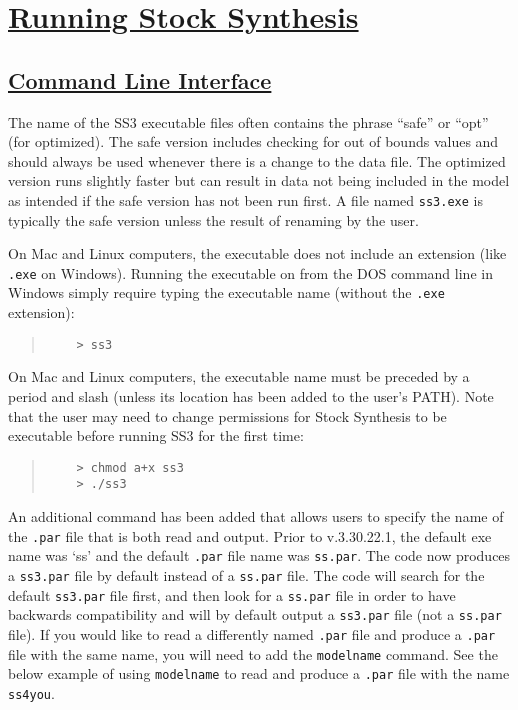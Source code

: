 \section[Running Stock Synthesis]{\protect\hyperref[sec:RunningSS3]{Running Stock Synthesis}} \label{sec:RunningSS3}

\hypertarget{CommandLine}{}
\subsection[Command Line Interface]{\protect\hyperlink{CommandLine}{Command Line Interface}}
The name of the SS3 executable files often contains the phrase ``safe'' or ``opt'' (for optimized). The safe version includes checking for out of bounds values and should always be used whenever there is a change to the data file. The optimized version runs slightly faster but can result in data not being included in the model as intended if the safe version has not been run first. A file named \texttt{ss3.exe} is typically the safe version unless the result of renaming by the user.

On Mac and Linux computers, the executable does not include an extension (like \texttt{.exe} on Windows).
Running the executable on from the DOS command line in Windows simply require typing the executable name (without the \texttt{.exe} extension):
\begin{quote}
	\begin{verbatim}
	> ss3
	\end{verbatim}
\end{quote}


On Mac and Linux computers, the executable name must be preceded by a period and slash (unless its location has been added to the user's PATH). Note that the user may need to change permissions for Stock Synthesis to be executable before running SS3 for the first time:

\begin{quote}
	\begin{verbatim}
	> chmod a+x ss3
	> ./ss3
	\end{verbatim}
\end{quote}

An additional command has been added that allows users to specify the name of the \texttt{.par} file that is both read and output. Prior to v.3.30.22.1, the default exe name was `ss' and the default \texttt{.par} file name was \texttt{ss.par}. The code now produces a \texttt{ss3.par} file by default instead of a \texttt{ss.par} file. The code will search for the default \texttt{ss3.par} file first, and then look for a \texttt{ss.par} file in order to have backwards compatibility and will by default output a \texttt{ss3.par} file (not a \texttt{ss.par} file). If you would like to read a differently named \texttt{.par} file and produce a \texttt{.par} file with the same name, you will need to add the \texttt{modelname} command. See the below example of using \texttt{modelname} to read and produce a \texttt{.par} file with the name \texttt{ss4you}.

